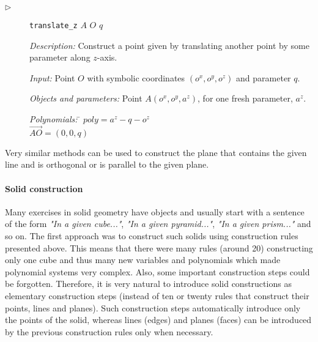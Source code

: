 \documentclass[final,1p,times,authoryear]{elsarticle}
\begin{document}
\begin{description}
\item[$\triangleright$] {\tt translate\_z} $A$ $O$ $q$

  {\em Description:} Construct a point given by translating another
  point by some parameter along $z$-axis.
  
  {\em Input:} Point $O$ with symbolic coordinates $(o^x, o^y, o^z)$
  and parameter $q$.

  {\em Objects and parameters:} Point $A(o^x, o^y, a^z)$, for one
  fresh parameter, $a^z$.

\begin{tabbing}
{\em Polynomials:} \= $poly = a^z - q - o^z$ \\
                   $\overrightarrow{AO} = (0, 0, q)$
\end{tabbing}
\end{description}

Very similar methods can be used to construct the plane that contains
the given line and is orthogonal or is parallel to the given plane.

\paragraph{Solid construction}
\label{objectconstruction}

Many exercises in solid geometry have objects and usually start with a
sentence of the form {\em "In a given cube..."}, {\em "In a given
  pyramid..."}, {\em "In a given prism..."} and so on. The first
approach was to construct such solids using construction rules
presented above. This means that there were many rules (around 20)
constructing only one cube and thus many new variables and polynomials
which made polynomial systems very complex. Also, some important
construction steps could be forgotten. Therefore, it is very natural
to introduce solid constructions as elementary construction steps
(instead of ten or twenty rules that construct their points, lines and
planes). Such construction steps automatically introduce only the
points of the solid, whereas lines (edges) and planes (faces) can be
introduced by the previous construction rules only when necessary.
\end{document}
